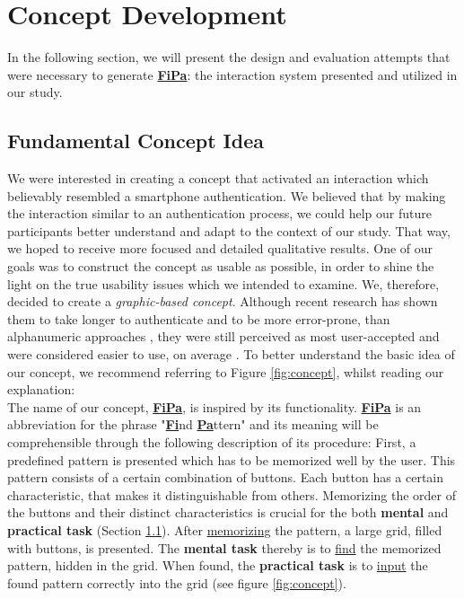 \section{Concept Development} \label{4.2}

In the following section, we will present the design and evaluation attempts that were necessary to generate \underline{\textbf{FiPa}}: the interaction system presented and utilized in our study. 

\subsection{Fundamental Concept Idea} \label{4.2.1}
We were interested in creating a concept that activated an interaction which believably resembled a smartphone authentication. We believed that by making the interaction similar to an authentication process, we could help our future participants better understand and adapt to the context of our study. That way, we hoped to receive more focused and detailed qualitative results. One of our goals was to construct the concept as usable as possible, in order to shine the light on the true usability issues which we intended to examine. We, therefore, decided to create a \textit{graphic-based concept}. Although recent research has shown them to take longer to authenticate and to be more error-prone, than alphanumeric approaches \cite{AnatomySmartphone}, they were still perceived as most user-accepted and were considered easier to use, on average \cite{PatternWild}. To better understand the basic idea of our concept, we recommend referring to Figure \ref{fig:concept}, whilst reading our explanation: \\ 

The name of our concept, \underline{\textbf{FiPa}}, is inspired by its functionality. \underline{\textbf{FiPa}} is an abbreviation for the phrase "\underline{\textbf{Fi}}nd \underline{\textbf{Pa}}ttern" and its meaning will be comprehensible through the following description of its procedure: First, a predefined pattern is presented which has to be memorized well by the user. This pattern consists of a certain combination of buttons. Each button has a certain characteristic, that makes it distinguishable from others. Memorizing the order of the buttons and their distinct characteristics is crucial for the both \textbf{mental} and \textbf{practical task} (Section \ref{4.2.1}). After \underline{memorizing} the pattern, a large grid, filled with buttons, is presented. The \textbf{mental task} thereby is to \underline{find} the memorized pattern, hidden in the grid. When found, the \textbf{practical task} is to \underline{input} the found pattern correctly into the grid (see figure \ref{fig:concept}).\\


